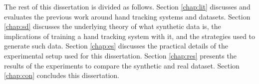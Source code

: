 The rest of this dissertation is divided as follows. Section \ref{chap:lit} discusses and evaluates the previous work around hand tracking systems and datasets. Section \ref{chap:sd} discusses the underlying theory of what synthetic data is, the implications of training a hand tracking system with it, and the strategies used to generate such data. Section \ref{chap:es} discusses the practical details of the experimental setup used for this dissertation. Section \ref{chap:res} presents the results of the experiments to compare the synthetic and real dataset. Section \ref{chap:con} concludes this dissertation.





